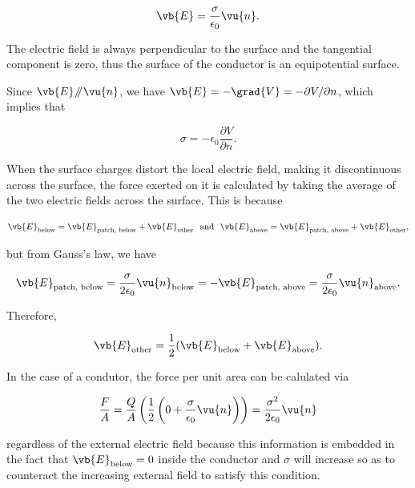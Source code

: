 \documentclass[english,a4paper,12pt]{report}
\begin{document}
\begin{equation}
    \vb{E} = \frac{\sigma }{\epsilon_0} \vu{n}. 
\end{equation}

The electric field is always perpendicular to the surface and the tangential component is zero, thus the surface of the conductor is an equipotential surface.

Since \(\vb{E} \mathbin{\!/\mkern-5mu/\!} \vu{n} \), we have \(\vb{E} = - \grad{V} = - \partial V / \partial n\), which implies that 

\begin{equation}
    \sigma = -\epsilon _{0}\frac{\partial V}{\partial n}.  
\end{equation}

When the surface charges distort the local electric field, making it discontinuous across the surface, the force exerted on it is calculated by taking the average of the two electric fields across the surface. This is because

\begin{equation}
    \vb{E} _{\text{below} } = \vb{E} _{\text{patch, below} } + \vb{E} _{\text{other} } ~\text { and }~ \vb{E} _{\text{above} } = \vb{E} _{\text{patch, above} } + \vb{E} _{\text{other} },  
\end{equation}

but from Gauss's law, we have

\begin{equation}
    \vb{E} _{\text{patch, below} } = \frac{\sigma }{2 \epsilon _0}\vu{n} _{\text{below} } = - \vb{E} _{\text{patch, above} } = \frac{\sigma }{2 \epsilon _0}\vu{n} _{\text{above} }.    
\end{equation}

Therefore, 

\begin{equation}
    \vb{E} _{\text{other} } = \frac{1}{2}(\vb{E} _{\text{below} } + \vb{E} _{\text{above} }  ).   
\end{equation}

In the case of a condutor, the force per unit area can be calulated via

\begin{equation}
    \frac{F}{A} = \frac{Q}{A}\left( \frac{1}{2} \left( 0 + \frac{\sigma }{\epsilon _{0} }\vu{n}   \right)  \right) = \frac{\sigma ^2}{2\epsilon _{0} }\vu{n}
\end{equation}

regardless of the external electric field because this information is embedded in the fact that \(\vb{E} _{\text{below} } = 0 \) inside the conductor and \(\sigma \) will increase so as to counteract the increasing external field to satisfy this condition.
\end{document}
